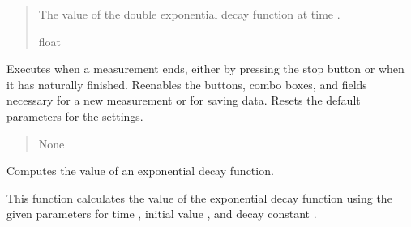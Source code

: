 \documentclass[letterpaper,10pt,english]{sphinxmanual}
\begin{document}
\begin{fulllineitems}
\begin{fulllineitems}
\begin{quote}
\begin{description}
\begin{itemize}
\end{itemize}

\sphinxAtStartPar
The value of the double exponential decay function at time .

\sphinxAtStartPar
float

\end{description}\end{quote}

\end{fulllineitems}


\begin{fulllineitems}
\label{\detokenize{FLIMGraphics:FLIMGraphics.FLIMGraphic.enableAfterFinisihThread}}
\pysigstartsignatures
{}
\pysigstopsignatures
\sphinxAtStartPar
Executes when a measurement ends, either by pressing the stop button 
or when it has naturally finished. Re\sphinxhyphen{}enables the buttons, combo boxes, 
and fields necessary for a new measurement or for saving data. 
Resets the default parameters for the settings.
\begin{quote}\begin{description}
\sphinxAtStartPar
None

\end{description}\end{quote}

\end{fulllineitems}


\begin{fulllineitems}
\label{\detokenize{FLIMGraphics:FLIMGraphics.FLIMGraphic.exp_decay}}
\pysigstartsignatures
{}
\pysigstopsignatures
\sphinxAtStartPar
Computes the value of an exponential decay function.

\sphinxAtStartPar
This function calculates the value of the exponential decay function using the given parameters for time , 
initial value , and decay constant .


\end{fulllineitems}
\end{fulllineitems}
\end{document}
